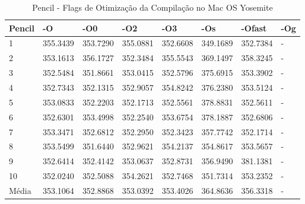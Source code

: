\begin{table}[!ht]
\centering
\caption{Pencil - Flags de Otimização da Compilação no Mac OS Yosemite}
\label{tab:otimizacao_compilacao:mac:pencil}
\begin{tabular}{llllllll}
\textbf{Pencil}         & \textbf{-O}  & \textbf{-O0}   & \textbf{-O2} & \textbf{-O3} & \textbf{-Os} & \textbf{-Ofast} & \textbf{-Og} \\ \toprule
1                       & 355.3439     &   353.7290     &    355.0881  &    352.6608  &   349.1689   &   352.7384      &  -           \\ 
2                       & 353.1613     &   356.1727     &    352.3484  &    355.5543  &   369.1497   &   358.3245      &  -           \\ 
3                       & 352.5484     &   351.8661     &    353.0415  &    352.5796  &   375.6915   &   353.3902      &  -           \\ 
4                       & 352.7343     &   352.1315     &    352.9057  &    354.8242  &   376.2380   &   353.5124      &  -           \\ 
5                       & 353.0833     &   352.2203     &    352.1713  &    352.5561  &   378.8831   &   352.5611      &  -           \\ 
6                       & 352.6301     &   353.4998     &    352.2540  &    353.6754  &   378.1887   &   352.6806      &  -           \\ 
7                       & 353.3471     &   352.6812     &    352.2950  &    352.3423  &   357.7742   &   352.1714      &  -           \\ 
8                       & 353.5499     &   351.6440     &    352.9621  &    354.2137  &   354.8617   &   353.5657      &  -           \\ 
9                       & 352.6414     &   352.4142     &    353.0637  &    352.8731  &   356.9490   &   381.1381      &  -           \\ 
10                      & 352.0240     &   352.5088     &    354.2621  &    352.7468  &   351.7314   &   353.2352      &  -           \\ \bottomrule
Média                   & 353.1064     &   352.8868     &    353.0392  &    353.4026  &   364.8636   &   356.3318      &  -           \\ 
\end{tabular}
\end{table}

